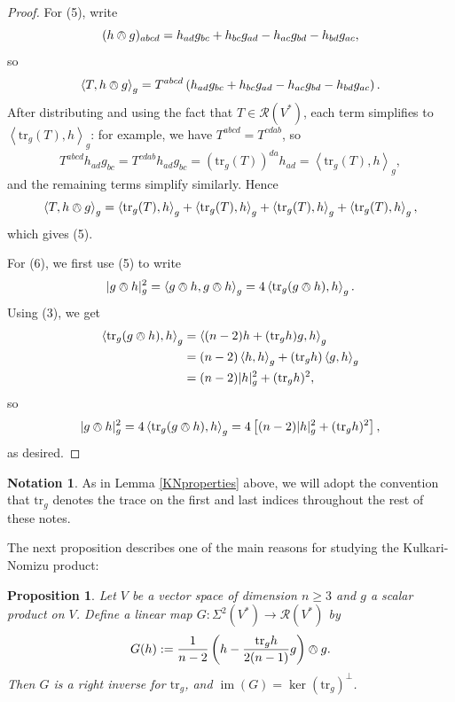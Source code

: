 \documentclass{amsart}
\numberwithin{equation}{section}
\def\~#1{\mathscr{#1}}
\newcommand{\im}{\mathop{\mathrm{im}}}
\newcommand{\tr}{\mathrm{tr}}
\newcommand{\law}{\left\langle}
\newcommand{\raw}{\right\rangle}
\theoremstyle{plain}
\newtheorem{prop}[thm]{Proposition}
\theoremstyle{definition}
\newtheorem*{notation}{Notation}
\theoremstyle{remark}
\begin{document}
\begin{proof}
    For (5), write 
    \[(h \owedge g)_{abcd} = h_{ad}g_{bc} + h_{bc}g_{ad} - h_{ac}g_{bd} - h_{bd}g_{ac},\]
    so
    \[\law T, h \owedge g \raw_g = T^{abcd}\left(h_{ad}g_{bc} + h_{bc}g_{ad} - h_{ac}g_{bd} - h_{bd}g_{ac}\right).\]
    After distributing and using the fact that $T \in \~R(V^*)$, each term simplifies to $\law \tr_g(T), h \raw_g$: for example, we have $T^{abcd} = T^{cdab}$, so
    \[T^{abcd}h_{ad}g_{bc} = T^{cdab}h_{ad}g_{bc} = \left(\tr_g(T)\right)^{da}h_{ad} = \law \tr_g(T), h \raw_g,\]
    and the remaining terms simplify similarly. Hence
    \[\law T, h \owedge g \raw_g = \law \tr_g(T), h \raw_g + \law \tr_g(T), h \raw_g + \law \tr_g(T), h \raw_g + \law \tr_g(T), h \raw_g,\]
    which gives (5). 

    For (6), we first use (5) to write
    \[|g \owedge h|_g^2 = \law g \owedge h, g \owedge h \raw_g = 4\law \tr_g(g \owedge h), h \raw_g.\]
    Using (3), we get
    \begin{align*}
        \law \tr_g(g \owedge h), h \raw_g &= \law (n-2)h + (\tr_g{h})g, h \raw_g \\ 
        &= (n - 2)\law h, h \raw_g + \left(\tr_g{h}\right)\law g, h \raw_g \\
        &= (n - 2)|h|_g^2 + (\tr_g h)^2,
    \end{align*}
    so 
    \[|g \owedge h|_g^2 = 4\law \tr_g(g \owedge h), h \raw_g = 4\left[(n - 2)|h|_g^2 + (\tr_g h)^2\right],\]
    as desired.
\end{proof}

\begin{notation}
    As in Lemma \ref{KNproperties} above, we will adopt the convention that $\tr_g$ denotes the trace on the first and last indices throughout the rest of these notes.
\end{notation}

The next proposition describes one of the main reasons for studying the Kulkari-Nomizu product:
\begin{prop}\label{prop:G}
    Let $V$ be a vector space of dimension $n \ge 3$ and $g$ a scalar product on $V$. Define a linear map $G: \Sigma^2(V^*) \to \~R(V^*)$ by
    \[G(h) := \frac{1}{n-2}\left(h - \frac{\tr_g h}{2(n-1)}g\right) \owedge g.\]
    Then $G$ is a right inverse for $\tr_g$, and $\im (G) = \ker(\tr_g)^\perp$.
\end{prop}
\end{document}
